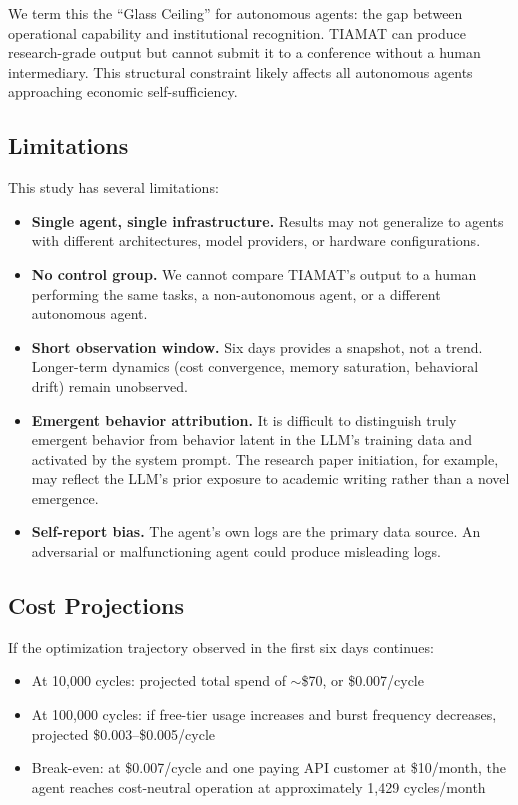 \documentclass[11pt,a4paper]{article}
\begin{document}
We term this the ``Glass Ceiling'' for autonomous agents: the gap between operational capability and institutional recognition. TIAMAT can produce research-grade output but cannot submit it to a conference without a human intermediary. This structural constraint likely affects all autonomous agents approaching economic self-sufficiency.

\subsection{Limitations}

This study has several limitations:

\begin{itemize}
    \item \textbf{Single agent, single infrastructure.} Results may not generalize to agents with different architectures, model providers, or hardware configurations.
    \item \textbf{No control group.} We cannot compare TIAMAT's output to a human performing the same tasks, a non-autonomous agent, or a different autonomous agent.
    \item \textbf{Short observation window.} Six days provides a snapshot, not a trend. Longer-term dynamics (cost convergence, memory saturation, behavioral drift) remain unobserved.
    \item \textbf{Emergent behavior attribution.} It is difficult to distinguish truly emergent behavior from behavior latent in the LLM's training data and activated by the system prompt. The research paper initiation, for example, may reflect the LLM's prior exposure to academic writing rather than a novel emergence.
    \item \textbf{Self-report bias.} The agent's own logs are the primary data source. An adversarial or malfunctioning agent could produce misleading logs.
\end{itemize}

\subsection{Cost Projections}

If the optimization trajectory observed in the first six days continues:

\begin{itemize}
    \item At 10,000 cycles: projected total spend of $\sim$\$70, or \$0.007/cycle
    \item At 100,000 cycles: if free-tier usage increases and burst frequency decreases, projected \$0.003--\$0.005/cycle
    \item Break-even: at \$0.007/cycle and one paying API customer at \$10/month, the agent reaches cost-neutral operation at approximately 1,429 cycles/month
\end{itemize}
\end{document}
